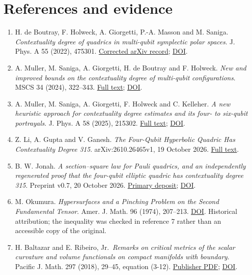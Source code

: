 \documentclass[11pt,letterpaper]{article}
\providecommand{\tightlist}{\setlength{\itemsep}{0pt}\setlength{\parskip}{0pt}}
\begin{document}
\clearpage
\section{References and evidence}\label{references-and-evidence}

\begin{enumerate}
\def\labelenumi{\arabic{enumi}.}
\tightlist
\item
  H. de Boutray, F. Holweck, A. Giorgetti, P.-A. Masson and M. Saniga. \emph{Contextuality degree of quadrics in multi-qubit symplectic polar spaces}. J. Phys. A 55 (2022), 475301. \href{https://arxiv.org/abs/2105.13798}{Corrected arXiv record}; \href{https://doi.org/10.1088/1751-8121/aca36f}{DOI}.
\item
  A. Muller, M. Saniga, A. Giorgetti, H. de Boutray and F. Holweck. \emph{New and improved bounds on the contextuality degree of multi-qubit configurations}. MSCS 34 (2024), 322--343. \href{https://arxiv.org/html/2305.10225v3}{Full text}; \href{https://doi.org/10.1017/S0960129524000057}{DOI}.
\item
  A. Muller, M. Saniga, A. Giorgetti, F. Holweck and C. Kelleher. \emph{A new heuristic approach for contextuality degree estimates and its four- to six-qubit portrayals}. J. Phys. A 58 (2025), 215302. \href{https://arxiv.org/html/2407.02928v1}{Full text}; \href{https://doi.org/10.1088/1751-8121/add22b}{DOI}.
\item
  Z. Li, A. Gupta and V. Ganesh. \emph{The Four-Qubit Hyperbolic Quadric Has Contextuality Degree 315}. arXiv:2610.26465v1, 19 October 2026. \href{https://arxiv.org/html/2610.26465v1}{Full text}.
\item
  B. W. Jonah. \emph{A section--square law for Pauli quadrics, and an independently regenerated proof that the four-qubit elliptic quadric has contextuality degree 315}. Preprint v0.7, 20 October 2026. \href{https://zenodo.org/records/23510634}{Primary deposit}; \href{https://doi.org/10.5281/zenodo.23510634}{DOI}.
\item
  M. Okumura. \emph{Hypersurfaces and a Pinching Problem on the Second Fundamental Tensor}. Amer. J. Math. 96 (1974), 207--213. \href{https://doi.org/10.2307/2373587}{DOI}. Historical attribution; the inequality was checked in reference 7 rather than an accessible copy of the original.
\item
  H. Baltazar and E. Ribeiro, Jr.~\emph{Remarks on critical metrics of the scalar curvature and volume functionals on compact manifolds with boundary}. Pacific J. Math. 297 (2018), 29--45, equation (3-12). \href{https://msp.org/pjm/2018/297-1/pjm-v297-n1-p02-s.pdf}{Publisher PDF}; \href{https://doi.org/10.2140/pjm.2018.297.29}{DOI}.

\end{enumerate}
\end{document}
